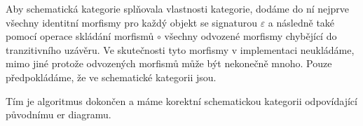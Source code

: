 Aby schematická kategorie splňovala vlastnosti kategorie, dodáme do ní nejprve všechny identitní morfismy pro každý objekt se signaturou $\varepsilon$ a následně také pomocí operace skládání morfismů $\circ$ všechny odvozené morfismy chybějící do tranzitivního uzávěru.
Ve skutečnosti tyto morfismy v implementaci neukládáme, mimo jiné protože odvozených morfismů může být nekonečně mnoho.
Pouze předpokládáme, že ve schematické kategorii jsou.

Tím je algoritmus dokončen a máme korektní schematickou kategorii odpovídající původnímu \acrshort{er} diagramu.
